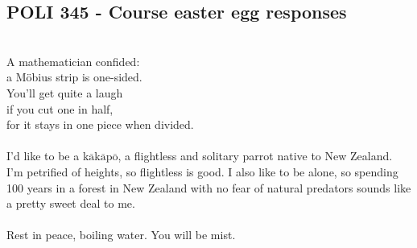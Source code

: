 \documentclass[12pt, letterpaper]{article}
\begin{document}
\begin{center}
    {\section*{\normalfont\normalsize\bf POLI 345 - Course easter egg responses}}
\end{center}

\vspace{12pt}\\
A mathematician confided:\\
a M{\"o}bius strip is one-sided.\\
You'll get quite a laugh\\
if you cut one in half,\\
for it stays in one piece when divided.\vspace{12pt}\\

\vspace{12pt}\\
I'd like to be a k$\overline{\mbox{a}}$k$\overline{\mbox{a}}$p$\overline{\mbox{o}}$,
a flightless and solitary parrot native to New Zealand. I'm petrified of heights, so flightless
is good. I also like to be alone, so spending 100 years in a forest in New Zealand with no fear
of natural predators sounds like a pretty sweet deal to me. \vspace{12pt}\\

\vspace{12pt}\\
Rest in peace, boiling water. You will be mist.
\end{document}
